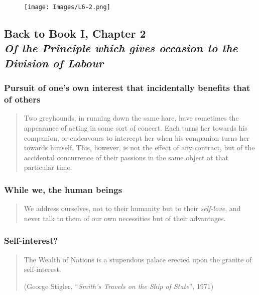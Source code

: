             \begin{figure}[h]
                \centering
                \texttt{[image: Images/L6-2.png]}
                \label{fig:L6-2}
            \end{figure}

    \subsection[Back to "Of the Principle which gives occasion to the Division of Labour"]{Back to Book I, Chapter 2 \\
                \textit{Of the Principle which gives occasion to the Division of Labour}}

        \subsubsection{Pursuit of one’s own interest that incidentally benefits that of others}

            \begin{quote}
                Two greyhounds, in running down the same hare, have sometimes the appearance of acting in some sort of concert. Each turns her towards his companion, or endeavours to intercept her when his companion turns her towards himself. This, however, is not the effect of any contract, but of the accidental concurrence of their passions in the same object at that particular time.
            \end{quote}

        \subsubsection{While we, the human beings}

            \begin{quote}
                We address ourselves, not to their humanity but to their \textit{self-love}, and never talk to them of our own necessities but of their advantages.
            \end{quote}

        \subsubsection{Self-interest?}

            \begin{quote}
                The Wealth of Nations is a stupendous palace erected upon the granite of self-interest.

                (George Stigler, “\textit{Smith’s Travels on the Ship of State}”, 1971)
            \end{quote} 

